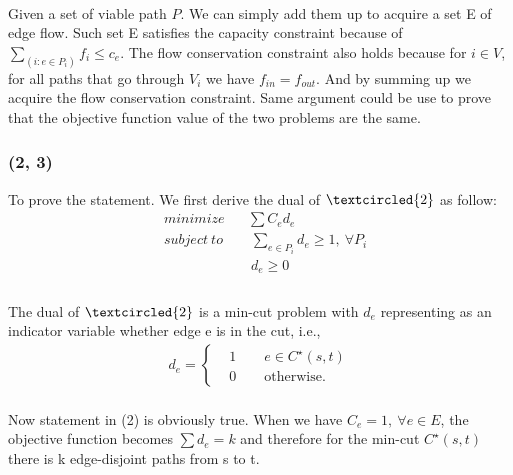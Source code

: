 \paragraph{}
Given a set of viable path $P$. We can simply add them up to acquire a set E of edge flow. Such set E satisfies the capacity constraint because of $\underset{(i:e\in P_i)}{\sum}f_i \leq c_e$. The flow conservation constraint also holds because for $i \in V$, for all paths that go through $V_i$ we have $f_{in} = f_{out}$. And by summing up we acquire the flow conservation constraint. Same argument could be use to prove that the objective function value of the two problems are the same.
\subsubsection*{(2, 3)}
To prove the statement. We first derive the dual of $\textcircled{2}$ as follow:
\begin{align*}
& minimize \quad \ \ \  \sum C_ed_e\\
& subject \ to \qquad \underset{e\in P_i}{\sum} d_e \geq 1, \ \forall P_i\\
& \qquad \qquad \qquad  \ d_e \geq 0 \\
\end{align*}
\vspace{-42pt}
\paragraph{}
The dual of $\textcircled{2}$ is a min-cut problem with $d_e$ representing as an indicator variable whether edge e is in the cut, i.e.,
\begin{align*}
d_e = \begin{cases}
&1 \qquad e \in C^{\star}(s, t)\\
&0 \qquad \text{otherwise}.
\end{cases}
\end{align*}
\paragraph{}
Now statement in (2) is obviously true. When we have $C_e=1, \ \forall e \in E$, the objective function becomes $\sum d_e=k$ and therefore for the min-cut $C^{\star}(s, t)$ there is k edge-disjoint paths from s to t.